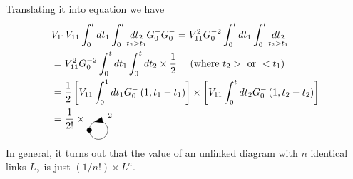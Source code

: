 Translating it into equation we have
$$
\begin{aligned}
&V_{11} V_{11} \int_{0}^{t} d t_{1} \int_{0}^{t} \underset{t_2>t_1}{d t_{2}} G_{0}^{-} G_{0}^{-}=V_{11}^{2} G_{0}^{-2} \int_{0}^{t} d t_{1} \int_{0}^{t} \underset{t_2>t_1}{d t_{2}}\\
&=V_{11}^{2} G_{0}^{-2} \int_{0}^{t} d t_{1} \int_{0}^{t} d t_{2} \times \frac{1}{2} \quad \text { (where } t_{2}>\text { or }<t_{1})\\
&=\frac{1}{2}\left[V_{11} \int_{0}^{1} d t_{1} G_{0}^{-}\left(1, t_{1}-t_{1}\right)\right] \times\left[V_{11} \int_{0}^{t} d t_{2} G_{0}^{-}\left(1, t_{2}-t_{2}\right)\right]\\
&=\frac{1}{2!}\times\selfcirc^2
\end{aligned}
$$
In general, it turns out that the value of an unlinked diagram with $n$ identical links $L,$ is just $(1 / n !) \times L^{n}$.

